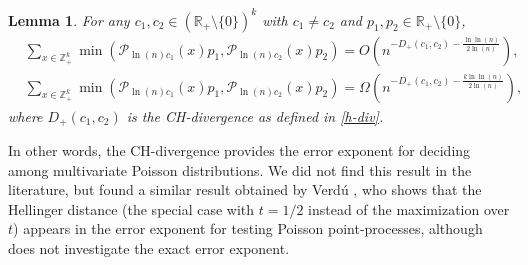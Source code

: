 \documentclass[11pt]{article}
\newcommand{\dd}{D_+}
\newcommand{\mR}{\mathbb{R}}
\newcommand{\mZ}{\mathbb{Z}}
\newcommand{\1}{\mathbb{1}}
\newtheorem{lemma}{Lemma}
\begin{document}
\begin{lemma}\label{hell-expo}
For any $c_1, c_2 \in (\mR_+\setminus \{0\})^k$ with $c_1 \neq c_2$ and $p_1,p_2 \in \mR_+\setminus \{0\}$, 
\begin{align}
& \sum_{x \in \mZ_+^k} \min(\mathcal{P}_{\ln(n) c_1}(x) p_{1} ,  \mathcal{P}_{\ln(n) c_2}(x) p_{2}) = O\left(n^{- \dd(c_1,c_2) - \frac{\ln\ln(n)}{2 \ln(n)}} \right),\\
& \sum_{x \in \mZ_+^k} \min(\mathcal{P}_{\ln(n) c_1}(x) p_{1} ,  \mathcal{P}_{\ln(n) c_2}(x) p_{2}) = \Omega \left(n^{- \dd(c_1,c_2) - \frac{k \ln\ln(n)}{2 \ln(n)}} \right),
\end{align}
where $\dd(c_1,c_2)$ is the CH-divergence as defined in \eqref{h-div}.
\end{lemma}
In other words, the CH-divergence provides the error exponent for deciding among multivariate Poisson distributions. We did not find this result in the literature, but found a similar result obtained by Verd\'u \cite{verdu-hell}, who shows that the Hellinger distance (the special case with $t=1/2$ instead of the maximization over $t$) appears in the error exponent for testing Poisson point-processes, although \cite{verdu-hell} does not investigate the exact error exponent.  
\end{document}
